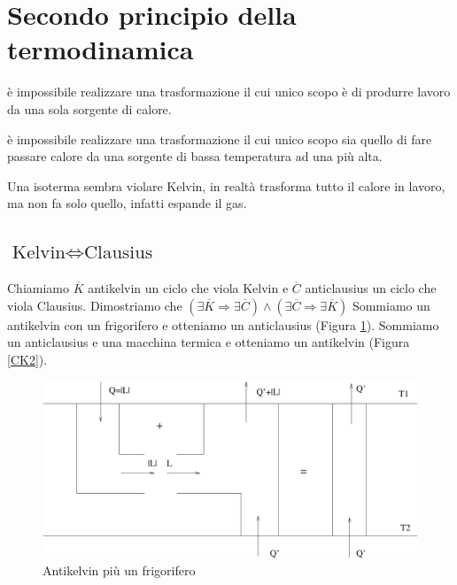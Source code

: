 \section{Secondo principio della termodinamica}

\begin{Pri}
è impossibile realizzare una trasformazione il cui unico scopo è di produrre lavoro da una sola sorgente di calore.
\end{Pri}

\begin{Pri}
è impossibile realizzare una trasformazione il cui unico scopo sia quello di fare passare calore da una sorgente di bassa temperatura ad una più alta.
\end{Pri}

Una isoterma sembra violare Kelvin, in realtà trasforma tutto il calore in lavoro, ma non fa solo quello, infatti espande il gas.
\subsection{\texorpdfstring{$\text{Kelvin}\Leftrightarrow\text{Clausius}$}{Kelvin <=> Clausius}}

Chiamiamo $\overline{K}$ antikelvin un ciclo che viola Kelvin e $\overline{C}$ anticlausius un ciclo che viola Clausius. Dimostriamo che $(\exists\overline{K}\Rightarrow\exists\overline{C})\wedge(\exists\overline{C}\Rightarrow\exists\overline{K})$
Sommiamo un antikelvin con un frigorifero e otteniamo un anticlausius (Figura \ref{CK1}).
Sommiamo un anticlausius e una macchina termica e otteniamo un antikelvin (Figura \ref{CK2}).
\begin{figure}[htbp]
\centering
\includegraphics[scale=0.5]{immagini/fisica1/AK+Frigo}
\caption{Antikelvin più un frigorifero}
\label{CK1}
\end{figure}

